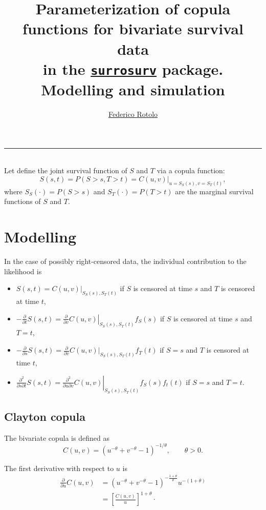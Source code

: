 \documentclass{article}
\title{Parameterization of copula functions for bivariate survival data \\
  in the \href{https://cran.r-project.org/package=surrosurv}{\texttt{surrosurv}} package.\\
  Modelling and simulation}
\author{\href{mailto:Federico Rotolo <federico.rotolo@gustaveroussy.fr>
?Subject=R:::surrosurv}{Federico Rotolo}}
\begin{document}
\maketitle
\hrule~\\[1em]

Let define the joint survival function of $S$ and $T$
    via a copula function:
    \begin{equation}
    S(s, t) = P(S> s, T> t) = \left.C(u,v)\right|_{u = S_S(s), v = S_T(t)},
    \end{equation}
    where $S_S(\cdot)=P(S> s)$ and $S_T(\cdot)=P(T> t)$
    are the marginal survival functions of $S$ and $T$.

\section*{Modelling}
In the case of possibly right-censored data,
    the individual contribution to the likelihood is
\begin{itemize}
\item $S(s, t) = \left.C(u,v)\right|_{S_S(s), S_T(t)}$
    if $S$ is censored at time $s$ and $T$ is censored at time $t$,
\item $-\frac{\partial}{\partial t}S(s, t) = 
    \left.\frac{\partial}{\partial v} C(u,v)\right|_{S_S(s), S_T(t)} f_S(s)$
    if $S$ is censored at time $s$ and $T=t$,
\item $-\frac{\partial}{\partial s}S(s, t) =
    \frac{\partial}{\partial v}\left.C(u,v)\right|_{S_S(s), S_T(t)} f_T(t)$
    if $S=s$ and $T$ is censored at time $t$,
\item $\frac{\partial^2}{\partial s \partial t}S(s, t) = 
    \left.\frac{\partial^2}{\partial u \partial v}C(u,v)\right|_{S_S(s), S_T(t)}
    f_S(s)f_t(t)$ if $S=s$ and $T=t$.
\end{itemize}


\subsection*{Clayton copula}
The bivariate \cite{Clayton78} copula is defined as
\begin{equation}
    C(u,v)= \left(
        u^{-\theta} + v^{-\theta} - 1
        \right)^{-1/\theta}, \qquad \theta > 0.
\end{equation}

The first derivative with respect to $u$ is 
\begin{align}
    \frac{\partial}{\partial u}C(u,v)
    &=\left(u^{-\theta} + v^{-\theta} - 1\right)^{-\frac{1+\theta}\theta}
        u^{-(1+\theta)}
        \nonumber\\
    \label{eq:CCder1}
    &=\left[\frac{C(u, v)}u\right]^{1+\theta}\cdot
\end{align}
\end{document}
